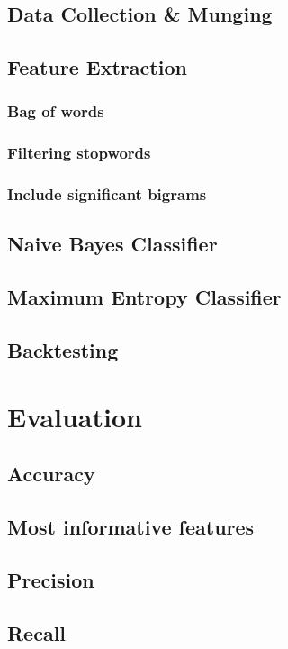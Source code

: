 \documentclass[twocolumn]{article}
\begin{document}
\subsection{Data Collection \& Munging}
\subsection{Feature Extraction}
\subsubsection{Bag of words}
\subsubsection{Filtering stopwords}
\subsubsection{Include significant bigrams}


\subsection{Naive Bayes Classifier}
\subsection{Maximum Entropy Classifier}
\subsection{Backtesting}
\section{Evaluation}
\subsection{Accuracy}

\subsection{Most informative features}

\subsection{Precision}

\subsection{Recall}
\end{document}
